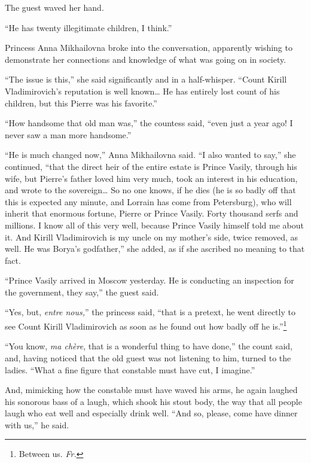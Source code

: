 The guest waved her hand.

``He has twenty illegitimate children, I think.''

Princess Anna Mikhailovna broke into the conversation, apparently wishing to demonstrate her connections and knowledge of what was going on in society.

``The issue is this,'' she said significantly and in a half-whisper. ``Count Kirill Vladimirovich's reputation is well known\ldots{} He has entirely lost count of his children, but this Pierre was his favorite.'' %

``How handsome that old man was,'' the countess said, ``even just a year ago! I never saw a man more handsome.'' %

``He is much changed now,'' Anna Mikhailovna said. ``I also wanted to say,'' she continued, ``that the direct heir of the entire estate is Prince Vasily, through his wife, but Pierre's father loved him very much, took an interest in his education, and wrote to the sovereign\ldots{} So no one knows, if he dies (he is so badly off that this is expected any minute, and Lorrain has come from Petersburg), who will inherit that enormous fortune, Pierre or Prince Vasily. Forty thousand serfs and millions. I know all of this very well, because Prince Vasily himself told me about it. And Kirill Vladimirovich is my uncle on my mother's side, twice removed, as well. He was Borya's godfather,'' she added, as if she ascribed no meaning to that fact. %

``Prince Vasily arrived in Moscow yesterday. He is conducting an inspection for the government, they say,'' the guest said.

``Yes, but, \textit{entre nous,}'' the princess said, ``that is a pretext, he went directly to see Count Kirill Vladimirovich as soon as he found out how badly off he is.''\footnote{Between us. \textit{Fr.}} %

``You know, \textit{ma ch\`ere}, that is a wonderful thing to have done,'' the count said, and, having noticed that the old guest was not listening to him, turned to the ladies. ``What a fine figure that constable must have cut, I imagine.'' %

And, mimicking how the constable must have waved his arms, he again laughed his sonorous bass of a laugh, which shook his stout body, the way that all people laugh who eat well and especially drink well. ``And so, please, come have dinner with us,'' he said. %


